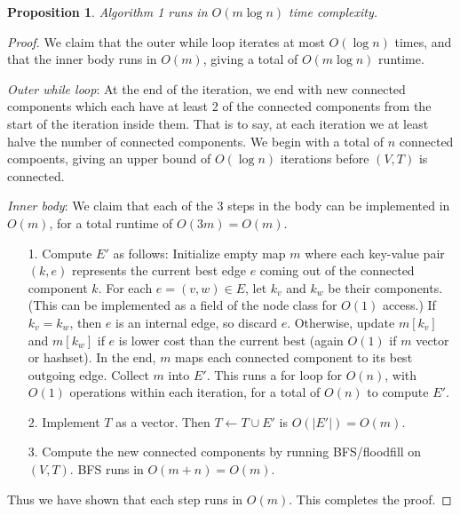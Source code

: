 \documentclass[10pt]{article}
\newtheorem{proposition}[lemma]{Proposition}
\begin{document}
\begin{enumerate}
\begin{proposition}
  Algorithm 1 runs in \(O(m \log n)\) time complexity.
\end{proposition}

\begin{proof}
  We claim that the outer while loop iterates at most \(O(\log n)\) times, and that the inner body runs in \(O(m)\), giving a total of \(O(m \log n)\) runtime. 

  \textit{Outer while loop}: At the end of the iteration, we end with new connected components which each have at least 2 of the connected components from the start of the iteration inside them. That is to say, at each iteration we at least halve the number of connected components. We begin with a total of \(n\) connected compoents, giving an upper bound of \(O(\log n)\) iterations before \((V, T)\) is connected.

  \textit{Inner body}: We claim that each of the 3 steps in the body can be implemented in \(O(m)\), for a total runtime of \(O(3m) = O(m)\). 
  \begin{enumerate}
    \item[1.] Compute \(E'\) as follows: Initialize empty map \(m\) where each key-value pair \((k, e)\) represents the current best edge \(e\) coming out of the connected component \(k\). For each \(e = (v, w) \in E\), let \(k_v\) and \(k_w\) be their components. (This can be implemented as a field of the node class for \(O(1)\) access.) If \(k_v = k_w\), then \(e\) is an internal edge, so discard \(e\). Otherwise, update \(m[k_v]\) and \(m[k_w]\) if \(e\) is lower cost than the current best (again \(O(1)\) if \(m\) vector or hashset). In the end, \(m\) maps each connected component to its best outgoing edge. Collect \(m\) into \(E'\). This runs a for loop for \(O(n)\), with \(O(1)\) operations within each iteration, for a total of \(O(n)\) to compute \(E'\).
    \item[2.] Implement \(T\) as a vector. Then \(T \gets T \cup E'\) is \(O(|E'|) = O(m)\).
    \item[3.] Compute the new connected components by running BFS/floodfill on \((V, T)\). BFS runs in \(O(m + n) = O(m)\).
  \end{enumerate}

  Thus we have shown that each step runs in \(O(m)\). This completes the proof.
\end{proof}

\end{enumerate}
\end{document}
